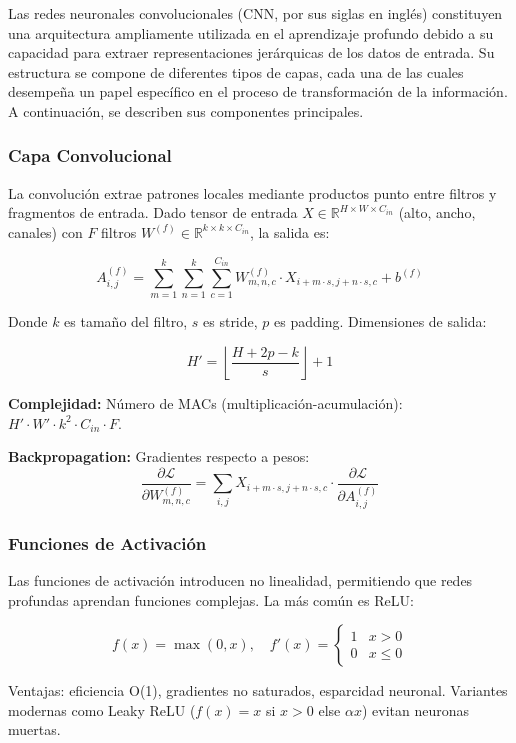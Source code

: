 Las redes neuronales convolucionales (CNN, por sus siglas en inglés) constituyen una arquitectura ampliamente utilizada en el aprendizaje profundo debido a su capacidad para extraer representaciones jerárquicas de los datos de entrada. Su estructura se compone de diferentes tipos de capas, cada una de las cuales desempeña un papel específico en el proceso de transformación de la información. A continuación, se describen sus componentes principales.  

\subsubsection*{Capa Convolucional}
La convolución extrae patrones locales mediante productos punto entre filtros y fragmentos de entrada. Dado tensor de entrada $X \in \mathbb{R}^{H \times W \times C_{in}}$ (alto, ancho, canales) con $F$ filtros $W^{(f)} \in \mathbb{R}^{k \times k \times C_{in}}$, la salida es:

\[
A^{(f)}_{i,j} = \sum_{m=1}^{k} \sum_{n=1}^{k} \sum_{c=1}^{C_{in}} W^{(f)}_{m,n,c} \cdot X_{i+m \cdot s, j+n \cdot s, c} + b^{(f)}
\]

Donde $k$ es tamaño del filtro, $s$ es stride, $p$ es padding. Dimensiones de salida:

\[H' = \left\lfloor \frac{H + 2p - k}{s} \right\rfloor + 1\]

\textbf{Complejidad:} Número de MACs (multiplicación-acumulación): $H' \cdot W' \cdot k^2 \cdot C_{in} \cdot F$.

\textbf{Backpropagation:} Gradientes respecto a pesos:
\[\frac{\partial \mathcal{L}}{\partial W^{(f)}_{m,n,c}} = \sum_{i,j} X_{i+m\cdot s, j+n\cdot s, c} \cdot \frac{\partial \mathcal{L}}{\partial A^{(f)}_{i,j}}\]  

\subsubsection*{Funciones de Activación}
Las funciones de activación introducen no linealidad, permitiendo que redes profundas aprendan funciones complejas. La más común es ReLU:

\[
f(x) = \max(0, x), \quad f'(x) = \begin{cases} 1 & x > 0 \\ 0 & x \leq 0 \end{cases}
\]

Ventajas: eficiencia O(1), gradientes no saturados, esparcidad neuronal. Variantes modernas como Leaky ReLU ($f(x) = x$ si $x>0$ else $\alpha x$) evitan neuronas muertas.  

